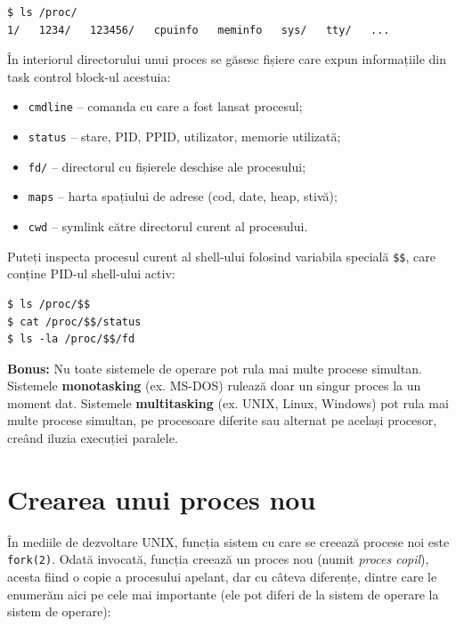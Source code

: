 \documentclass[12pt,a4paper]{article}
\begin{document}
\begin{lstlisting}[style=shell]
$ ls /proc/
1/   1234/   123456/   cpuinfo   meminfo   sys/   tty/   ...
\end{lstlisting}

În interiorul directorului unui proces se găsesc fișiere care expun informațiile
din task control block-ul acestuia:

\begin{itemize}
  \setlength{\itemsep}{0.75pt}
  \item \texttt{cmdline} -- comanda cu care a fost lansat procesul;
  \item \texttt{status} -- stare, PID, PPID, utilizator, memorie utilizată;
  \item \texttt{fd/} -- directorul cu fișierele deschise ale procesului;
  \item \texttt{maps} -- harta spațiului de adrese (cod, date, heap, stivă);
  \item \texttt{cwd} -- symlink către directorul curent al procesului.
\end{itemize}

Puteți inspecta procesul curent al shell-ului folosind variabila specială
\texttt{\$\$}, care conține PID-ul shell-ului activ:

\begin{lstlisting}[style=shell]
$ ls /proc/$$
$ cat /proc/$$/status
$ ls -la /proc/$$/fd
\end{lstlisting}

\begin{mdframed}[linecolor=gray, linewidth=0.5pt, backgroundcolor=gray!7,
  innertopmargin=6pt, innerbottommargin=6pt]
  \textbf{Bonus:} Nu toate sistemele de operare pot rula mai multe procese
  simultan. Sistemele \textbf{monotasking} (ex. MS-DOS) rulează doar un singur
  proces la un moment dat. Sistemele \textbf{multitasking} (ex. UNIX, Linux,
  Windows) pot rula mai multe procese simultan, pe procesoare diferite sau 
  alternat pe același procesor, creând iluzia execuției paralele.
\end{mdframed}

\section{Crearea unui proces nou}

În mediile de dezvoltare UNIX, funcția sistem cu care se creează 
procese noi este \texttt{fork(2)}. 
Odată invocată, funcția creează un proces nou 
(numit \textit{proces copil}),
acesta fiind o copie a procesului apelant, 
dar cu câteva diferențe, dintre care le enumerăm aici 
pe cele mai importante 
(ele pot diferi de la sistem de operare la sistem de operare):
\end{document}
